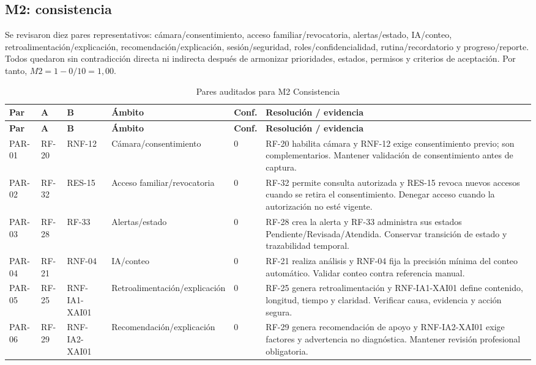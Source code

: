 \documentclass[12pt,a4paper]{article}
\begin{document}
\subsection{M2: consistencia}
Se revisaron diez pares representativos: cámara/consentimiento, acceso familiar/revocatoria, alertas/estado, IA/conteo, retroalimentación/explicación, recomendación/explicación, sesión/seguridad, roles/confidencialidad, rutina/recordatorio y progreso/reporte. Todos quedaron sin contradicción directa ni indirecta después de armonizar prioridades, estados, permisos y criterios de aceptación. Por tanto, $M2 = 1 - 0/10 = 1,00$.

\scriptsize
\begin{longtable}{p{}p{}p{}p{}p{}p{}}
\caption{Pares auditados para M2 Consistencia}\\
\toprule
\textbf{Par}&\textbf{A}&\textbf{B}&\textbf{Ámbito}&\textbf{Conf.}&\textbf{Resolución / evidencia}\\
\midrule\endfirsthead
\toprule
\textbf{Par}&\textbf{A}&\textbf{B}&\textbf{Ámbito}&\textbf{Conf.}&\textbf{Resolución / evidencia}\\
\midrule\endhead
PAR-01 & RF-20 & RNF-12 & Cámara/consentimiento & 0 & RF-20 habilita cámara y RNF-12 exige consentimiento previo; son complementarios. Mantener validación de consentimiento antes de captura. \\
PAR-02 & RF-32 & RES-15 & Acceso familiar/revocatoria & 0 & RF-32 permite consulta autorizada y RES-15 revoca nuevos accesos cuando se retira el consentimiento. Denegar acceso cuando la autorización no esté vigente. \\
PAR-03 & RF-28 & RF-33 & Alertas/estado & 0 & RF-28 crea la alerta y RF-33 administra sus estados Pendiente/Revisada/Atendida. Conservar transición de estado y trazabilidad temporal. \\
PAR-04 & RF-21 & RNF-04 & IA/conteo & 0 & RF-21 realiza análisis y RNF-04 fija la precisión mínima del conteo automático. Validar conteo contra referencia manual. \\
PAR-05 & RF-25 & RNF-IA1-XAI01 & Retroalimentación/explicación & 0 & RF-25 genera retroalimentación y RNF-IA1-XAI01 define contenido, longitud, tiempo y claridad. Verificar causa, evidencia y acción segura. \\
PAR-06 & RF-29 & RNF-IA2-XAI01 & Recomendación/explicación & 0 & RF-29 genera recomendación de apoyo y RNF-IA2-XAI01 exige factores y advertencia no diagnóstica. Mantener revisión profesional obligatoria. \\

\end{longtable}
\end{document}
